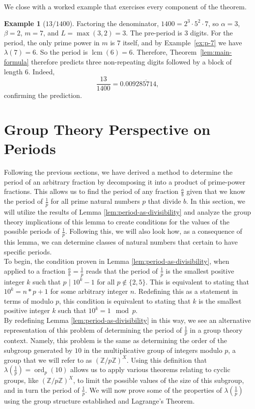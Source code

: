 \documentclass[12pt]{amsart}
\theoremstyle{definition}
\newtheorem{example}[theorem]{Example}
\theoremstyle{remark}
\newcommand{\ord}{\operatorname{ord}}
\newcommand{\lcm}{\operatorname{lcm}}
\begin{document}
We close with a worked example that exercises every component of the 
theorem.

\begin{example}[$13/1400$]\label{ex:1-over-1400}
Factoring the denominator, $1400 = 2^3 \cdot 5^2 \cdot 7$, so 
$\alpha = 3$, $\beta = 2$, $m = 7$, and $L = \max(3, 2) = 3$. The 
pre-period is $3$ digits. For the period, the only prime power in $m$ 
is $7$ itself, and by Example~\ref{ex:p-7} we have $\lambda(7) = 6$. 
So the period is $\lcm(6) = 6$. Therefore, Theorem~\ref{lem:main-formula} therefore predicts 
three non-repeating digits followed by a block of length $6$. Indeed,
\[
  \frac{13}{1400} = 0.009\overline{285714},
\]
confirming the prediction.
\end{example}

\section{Group Theory Perspective on Periods} \label{sec:group_theory}
Following the previous sections, we have derived a method to determine the period of an arbitrary fraction by decomposing it into a product of prime-power fractions. This allows us to find the period of any fraction $\frac{a}{b}$ given that we know the period of $\frac{1}{p}$ for all prime natural numbers $p$ that divide $b$. In this section, we will utilize the results of Lemma \ref{lem:period-as-divisibility} and analyze the group theory implications of this lemma to create conditions for the values of the possible periods of $\frac{1}{p}$. Following this, we will also look how, as a consequence of this lemma, we can determine classes of natural numbers that certain to have specific periods.\\

To begin, the condition proven in Lemma \ref{lem:period-as-divisibility}, when applied to a fraction $\frac{a}{b}=\frac{1}{p}$ reads that the period of $\frac{1}{p}$ is the smallest positive integer $k$ such that $p$ | $10^k-1$ for all $p\notin \{2,5\}$. This is equivalent to stating that $10^k=n*p+1$ for some arbitrary integer $n$. Redefining this as a statement in terms of modulo $p$, this condition is equivalent to stating that $k$ is the smallest positive integer $k$ such that $10^k=1\mod{p}$.\\

By redefining Lemma \ref{lem:period-as-divisibility} in this way, we see an alternative representation of this problem of determining the period of $\frac{1}{p}$ in a group theory context. Namely, this problem is the same as determining the order of the subgroup generated by $10$ in the multiplicative group of integers modulo $p$, a group that we will refer to as $(\mathbb{Z}/p\mathbb{Z})^X$. Using this definition that $\lambda(\frac{1}{p})=\ord_p(10)$ allows us to apply various theorems relating to cyclic groups, like $(\mathbb{Z}/p\mathbb{Z})^X$, to limit the possible values of the size of this subgroup, and in turn the period of $\frac{1}{p}$. We will now prove some of the properties of $\lambda(\frac{1}{p})$ using the group structure established and Lagrange's Theorem.
\end{document}
